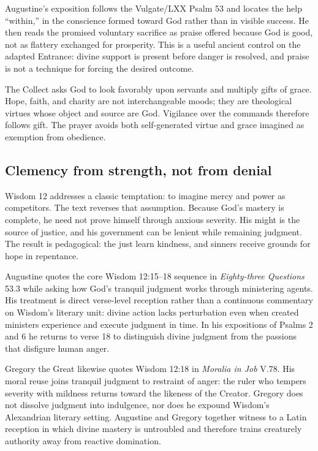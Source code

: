\begin{deepstudy}
Augustine's exposition follows the Vulgate/LXX Psalm 53 and locates the help “within,” in the conscience formed toward God rather than in visible success. He then reads the promised voluntary sacrifice as praise offered because God is good, not as flattery exchanged for prosperity. This is a useful ancient control on the adapted Entrance: divine support is present before danger is resolved, and praise is not a technique for forcing the desired outcome.

The Collect asks God to look favorably upon servants and multiply gifts of grace. Hope, faith, and charity are not interchangeable moods; they are theological virtues whose object and source are God. Vigilance over the commands therefore follows gift. The prayer avoids both self-generated virtue and grace imagined as exemption from obedience.

\subsection*{Clemency from strength, not from denial\enspace{}}

Wisdom 12 addresses a classic temptation: to imagine mercy and power as competitors. The text reverses that assumption. Because God's mastery is complete, he need not prove himself through anxious severity. His might is the source of justice, and his government can be lenient while remaining judgment. The result is pedagogical: the just learn kindness, and sinners receive grounds for hope in repentance.

Augustine quotes the core Wisdom 12:15--18 sequence in \emph{Eighty-three Questions} 53.3 while asking how God's tranquil judgment works through ministering agents. His treatment is direct verse-level reception rather than a continuous commentary on Wisdom's literary unit: divine action lacks perturbation even when created ministers experience and execute judgment in time. In his expositions of Psalms 2 and 6 he returns to verse 18 to distinguish divine judgment from the passions that disfigure human anger.

Gregory the Great likewise quotes Wisdom 12:18 in \emph{Moralia in Job} V.78. His moral reuse joins tranquil judgment to restraint of anger: the ruler who tempers severity with mildness returns toward the likeness of the Creator. Gregory does not dissolve judgment into indulgence, nor does he expound Wisdom's Alexandrian literary setting. Augustine and Gregory together witness to a Latin reception in which divine mastery is untroubled and therefore trains creaturely authority away from reactive domination.


\end{deepstudy}
